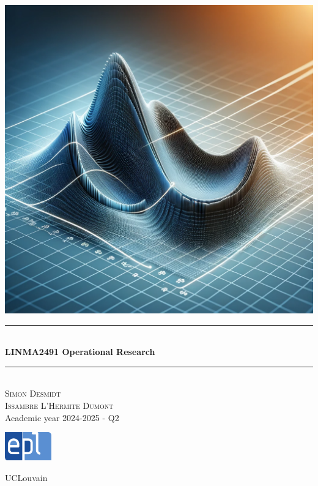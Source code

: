 \documentclass[12pt, openany]{report}
\newcommand{\HRule}{\rule{\linewidth}{0.5mm}}
\theoremstyle{definition}
\begin{document}
\begin{titlepage}
    \begin{sffamily}
    \begin{center}
        \includegraphics[scale=0.25]{img/page_de_garde.png} \\[1cm]
        \HRule \\[0.4cm]
        { \huge \bfseries LINMA2491 Operational Research \\[0.4cm] }
    
        \HRule \\[1.5cm]
        \textsc{\LARGE Simon Desmidt\\ Issambre L'Hermite Dumont}\\[1cm]
        \vfill
        \vspace{2cm}
        {\large Academic year 2024-2025 - Q2}
        \vspace{0.4cm}
         
        \includegraphics[width=0.15\textwidth]{img/epl.png}
        
        UCLouvain\\
    
    \end{center}
    \end{sffamily}
\end{titlepage}
\end{document}
